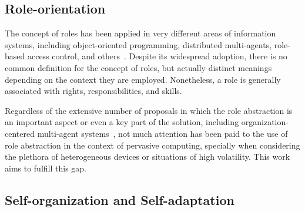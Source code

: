 
\subsection{Role-orientation}




The concept of roles has been applied in very different areas of information systems, including object-oriented programming, distributed multi-agents, role-based access control, and others~\cite{}. Despite its widespread adoption, there is no common definition for the concept of roles, but actually distinct meanings depending on the context they are employed. Nonetheless, a role is generally associated with rights, responsibilities, and skills.

Regardless of the extensive number of proposals in which the role abstraction is an important aspect or even a key part of the solution, including organization-centered multi-agent systems~\cite{}, not much attention has been paid to the use of role abstraction in the context of pervasive computing, specially when considering the plethora of heterogeneous devices or situations of high volatility. This work aims to fulfill this gap. %


\subsection{Self-organization and Self-adaptation}


